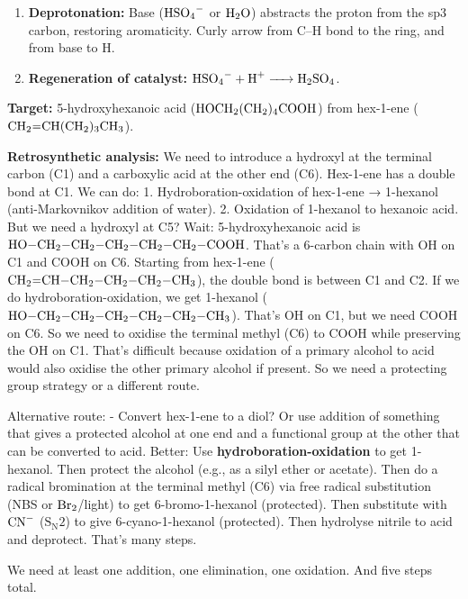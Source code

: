 \documentclass[11pt]{article}
\begin{document}
\begin{corrige}
\begin{enumerate}
\item \textbf{Deprotonation:}
Base (\(\ce{HSO4-}\) or \(\ce{H2O}\)) abstracts the proton from the sp3 carbon, restoring aromaticity. Curly arrow from C–H bond to the ring, and from base to H.

\item \textbf{Regeneration of catalyst:} \(\ce{HSO4- + H+ -> H2SO4}\).
\end{enumerate}
\end{corrige}

\begin{corrige}
\textbf{Target:} 5-hydroxyhexanoic acid (\(\ce{HOCH2(CH2)4COOH}\)) from hex-1-ene (\(\ce{CH2=CH(CH2)3CH3}\)).

\textbf{Retrosynthetic analysis:}
We need to introduce a hydroxyl at the terminal carbon (C1) and a carboxylic acid at the other end (C6). Hex-1-ene has a double bond at C1. We can do:
1. Hydroboration-oxidation of hex-1-ene → 1-hexanol (anti-Markovnikov addition of water).
2. Oxidation of 1-hexanol to hexanoic acid.
But we need a hydroxyl at C5? Wait: 5-hydroxyhexanoic acid is \(\ce{HO-CH2-CH2-CH2-CH2-CH2-COOH}\). That's a 6-carbon chain with OH on C1 and COOH on C6. Starting from hex-1-ene (\(\ce{CH2=CH-CH2-CH2-CH2-CH3}\)), the double bond is between C1 and C2. If we do hydroboration-oxidation, we get 1-hexanol (\(\ce{HO-CH2-CH2-CH2-CH2-CH2-CH3}\)). That's OH on C1, but we need COOH on C6. So we need to oxidise the terminal methyl (C6) to COOH while preserving the OH on C1. That's difficult because oxidation of a primary alcohol to acid would also oxidise the other primary alcohol if present. So we need a protecting group strategy or a different route.

Alternative route:
- Convert hex-1-ene to a diol? Or use addition of something that gives a protected alcohol at one end and a functional group at the other that can be converted to acid.
Better: Use \textbf{hydroboration-oxidation} to get 1-hexanol. Then protect the alcohol (e.g., as a silyl ether or acetate). Then do a radical bromination at the terminal methyl (C6) via free radical substitution (NBS or \(\ce{Br2}\)/light) to get 6-bromo-1-hexanol (protected). Then substitute with \(\ce{CN-}\) (\(\mathrm{S_N2}\)) to give 6-cyano-1-hexanol (protected). Then hydrolyse nitrile to acid and deprotect. That's many steps.

We need at least one addition, one elimination, one oxidation. And five steps total.


\end{corrige}
\end{document}
